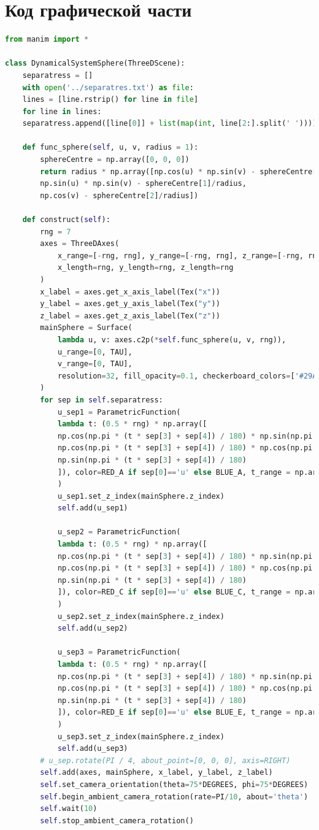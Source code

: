 	\section{Код графической части}
	\begin{lstlisting}[language=Python]
from manim import *

class DynamicalSystemSphere(ThreeDScene):
	separatress = []
	with open('../separatres.txt') as file:
	lines = [line.rstrip() for line in file]
	for line in lines:
	separatress.append([line[0]] + list(map(int, line[2:].split(' '))))
	
	def func_sphere(self, u, v, radius = 1):
		sphereCentre = np.array([0, 0, 0])
		return radius * np.array([np.cos(u) * np.sin(v) - sphereCentre[0]/radius,
		np.sin(u) * np.sin(v) - sphereCentre[1]/radius,
		np.cos(v) - sphereCentre[2]/radius])
	
	def construct(self):
		rng = 7
		axes = ThreeDAxes(
			x_range=[-rng, rng], y_range=[-rng, rng], z_range=[-rng, rng],
			x_length=rng, y_length=rng, z_length=rng
		)
		x_label = axes.get_x_axis_label(Tex("x"))
		y_label = axes.get_y_axis_label(Tex("y"))
		z_label = axes.get_z_axis_label(Tex("z"))
		mainSphere = Surface(
			lambda u, v: axes.c2p(*self.func_sphere(u, v, rng)),
			u_range=[0, TAU],
			v_range=[0, TAU],
			resolution=32, fill_opacity=0.1, checkerboard_colors=['#29ABCA', '#236B8E'], stroke_color=BLACK, stroke_width=0.1
		)
		for sep in self.separatress:
			u_sep1 = ParametricFunction(
			lambda t: (0.5 * rng) * np.array([
			np.cos(np.pi * (t * sep[3] + sep[4]) / 180) * np.sin(np.pi * (t * sep[1] + sep[2]) / 180),
			np.cos(np.pi * (t * sep[3] + sep[4]) / 180) * np.cos(np.pi * (t * sep[1] + sep[2]) / 180),
			np.sin(np.pi * (t * sep[3] + sep[4]) / 180)
			]), color=RED_A if sep[0]=='u' else BLUE_A, t_range = np.array([0, 1/3, 0.01])
			)
			u_sep1.set_z_index(mainSphere.z_index)
			self.add(u_sep1)
			
			u_sep2 = ParametricFunction(
			lambda t: (0.5 * rng) * np.array([
			np.cos(np.pi * (t * sep[3] + sep[4]) / 180) * np.sin(np.pi * (t * sep[1] + sep[2]) / 180),
			np.cos(np.pi * (t * sep[3] + sep[4]) / 180) * np.cos(np.pi * (t * sep[1] + sep[2]) / 180),
			np.sin(np.pi * (t * sep[3] + sep[4]) / 180)
			]), color=RED_C if sep[0]=='u' else BLUE_C, t_range = np.array([1/3, 2/3, 0.01])
			)
			u_sep2.set_z_index(mainSphere.z_index)
			self.add(u_sep2)
			
			u_sep3 = ParametricFunction(
			lambda t: (0.5 * rng) * np.array([
			np.cos(np.pi * (t * sep[3] + sep[4]) / 180) * np.sin(np.pi * (t * sep[1] + sep[2]) / 180),
			np.cos(np.pi * (t * sep[3] + sep[4]) / 180) * np.cos(np.pi * (t * sep[1] + sep[2]) / 180),
			np.sin(np.pi * (t * sep[3] + sep[4]) / 180)
			]), color=RED_E if sep[0]=='u' else BLUE_E, t_range = np.array([2/3, 1, 0.01])
			)
			u_sep3.set_z_index(mainSphere.z_index)
			self.add(u_sep3)
		# u_sep.rotate(PI / 4, about_point=[0, 0, 0], axis=RIGHT)
		self.add(axes, mainSphere, x_label, y_label, z_label)
		self.set_camera_orientation(theta=75*DEGREES, phi=75*DEGREES)
		self.begin_ambient_camera_rotation(rate=PI/10, about='theta')
		self.wait(10)
		self.stop_ambient_camera_rotation()
	\end{lstlisting}
